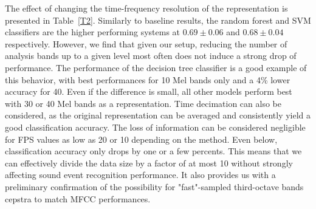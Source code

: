 \documentclass[sensors,article,submit,moreauthors,pdftex,10pt,a4paper]{mdpi}
\begin{document}
The effect of changing the time-frequency resolution of the representation is presented in Table~\ref{T2}. Similarly to baseline results, the random forest and SVM classifiers are the higher performing systems at $0.69\pm 0.06$ and $0.68\pm 0.04$ respectively. However, we find that given our setup, reducing the number of analysis bands up to a given level most often does not induce a strong drop of performance. The performance of the decision tree classifier is a good example of this behavior, with best performances for 10 Mel bands only and a 4\% lower accuracy for 40. Even if the difference is small, all other models perform best with 30 or 40 Mel bands as a representation. Time decimation can also be considered, as the original representation can be averaged and consistently yield a good classification accuracy. The loss of information can be considered negligible for FPS values as low as 20 or 10 depending on the method. Even below, classification accuracy only drops by one or a few percents. This means that we can effectively divide the data size by a factor of at most 10 without strongly affecting sound event recognition performance. It also provides us with a preliminary confirmation of the possibility for "fast"-sampled third-octave bands cepstra to match  MFCC performances.\\
\end{document}

